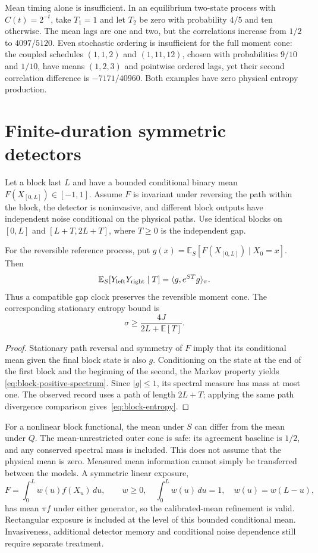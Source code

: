 Mean timing alone is insufficient. In an equilibrium two-state process with
$C(t)=2^{-t}$, take $T_1=1$ and let $T_2$ be zero with probability $4/5$ and ten
otherwise. The mean lags are one and two, but the correlations increase from
$1/2$ to $4097/5120$. Even stochastic ordering is insufficient for the full
moment cone: the coupled schedules $(1,1,2)$ and $(1,11,12)$, chosen with
probabilities $9/10$ and $1/10$, have means $(1,2,3)$ and pointwise ordered
lags, yet their second correlation difference is $-7171/40960$.
Both examples have zero physical entropy production.

\section{Finite-duration symmetric detectors}
Let a block last $L$ and have a bounded conditional binary mean
$F(X_{[0,L]})\in[-1,1]$. Assume $F$ is invariant under reversing the path within
the block, the detector is noninvasive, and different block outputs have
independent noise conditional on the physical paths. Use identical blocks on
$[0,L]$ and $[L+T,2L+T]$, where $T\geq0$ is the independent gap.

\begin{theorem}
For the reversible reference process, put
$g(x)=\mathbb E_S[F(X_{[0,L]})\mid X_0=x]$. Then
\begin{equation}
 \mathbb E_S[Y_{\rm left}Y_{\rm right}\mid T]
 =\langle g,e^{ST}g\rangle_\pi.
 \label{eq:block-positive-spectrum}
\end{equation}
Thus a compatible gap clock preserves the reversible moment cone. The
corresponding stationary entropy bound is
\begin{equation}
 \sigma\geq\frac{4J}{2L+\mathbb E[T]}.
 \label{eq:block-entropy}
\end{equation}
\end{theorem}
\begin{proof}
Stationary path reversal and symmetry of $F$ imply that its conditional mean
given the final block state is also $g$. Conditioning on the state at the end
of the first block and the beginning of the second, the Markov property yields
\eqref{eq:block-positive-spectrum}. Since $|g|\leq1$, its spectral measure has
mass at most one. The observed record uses a path of length $2L+T$; applying
the same path divergence comparison gives~\eqref{eq:block-entropy}.
\end{proof}

For a nonlinear block functional, the mean under $S$ can differ from the mean
under $Q$. The mean-unrestricted outer cone is safe: its agreement baseline is $1/2$,
and any conserved spectral mass is included. This does not assume that the
physical mean is zero. Measured mean information cannot simply be transferred
between the models. A symmetric
linear exposure,
\[
 F=\int_0^Lw(u)f(X_u)\,du,
 \qquad w\geq0,\quad\int_0^Lw(u)\,du=1,\quad w(u)=w(L-u),
\]
has mean $\pi f$ under either generator, so the calibrated-mean refinement
is valid. Rectangular exposure is included at the level of this bounded
conditional mean. Invasiveness, additional detector memory and conditional
noise dependence still require separate treatment.

